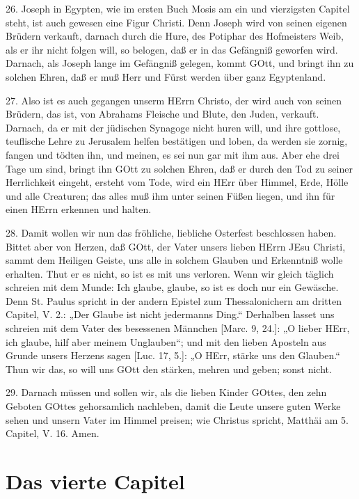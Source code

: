 26. Joseph in Egypten, wie im ersten Buch Mosis am ein und vierzigsten Capitel steht, ist auch gewesen eine Figur Christi. Denn Joseph wird von seinen eigenen Brüdern verkauft, darnach durch die Hure, des Potiphar des Hofmeisters Weib, als er ihr nicht folgen will, so belogen, daß er in das Gefängniß geworfen wird. Darnach, als Joseph lange im Gefängniß gelegen, kommt GOtt, und bringt ihn zu solchen Ehren, daß er muß Herr und Fürst werden über ganz Egyptenland.

27. Also ist es auch gegangen unserm HErrn Christo, der wird auch von seinen Brüdern, das ist, von Abrahams Fleische und Blute, den Juden, verkauft. Darnach, da er mit der jüdischen Synagoge nicht huren will, und ihre gottlose, teuflische Lehre zu Jerusalem helfen bestätigen und loben, da werden sie zornig, fangen und tödten ihn, und meinen, es sei nun gar mit ihm aus. Aber ehe drei Tage um sind, bringt ihn GOtt zu solchen Ehren, daß er durch den Tod zu seiner Herrlichkeit eingeht, ersteht vom Tode, wird ein HErr über Himmel, Erde, Hölle und alle Creaturen; das alles muß ihm unter seinen Füßen liegen, und ihn für einen HErrn erkennen und halten.

28. Damit wollen wir nun das fröhliche, liebliche Osterfest beschlossen haben. Bittet aber von Herzen, daß GOtt, der Vater unsers lieben HErrn JEsu Christi, sammt dem Heiligen Geiste, uns alle in solchem Glauben und Erkenntniß wolle erhalten. Thut er es nicht, so ist es mit uns verloren. Wenn wir gleich täglich schreien mit dem Munde: Ich glaube, glaube, so ist es doch nur ein Gewäsche. Denn St. Paulus spricht in der andern Epistel zum Thessalonichern am dritten Capitel, V. 2.: „Der Glaube ist nicht jedermanns Ding.“ Derhalben lasset uns schreien mit dem Vater des besessenen Männchen [Marc. 9, 24.]: „O lieber HErr, ich glaube, hilf aber meinem Unglauben“; und mit den lieben Aposteln aus Grunde unsers Herzens sagen [Luc. 17, 5.]: „O HErr, stärke uns den Glauben.“ Thun wir das, so will uns GOtt den stärken, mehren und geben; sonst nicht.

29. Darnach müssen und sollen wir, als die lieben Kinder GOttes, den zehn Geboten GOttes gehorsamlich nachleben, damit die Leute unsere guten Werke sehen und unsern Vater im Himmel preisen; wie Christus spricht, Matthäi am 5. Capitel, V. 16. Amen.

\section{Das vierte Capitel}

